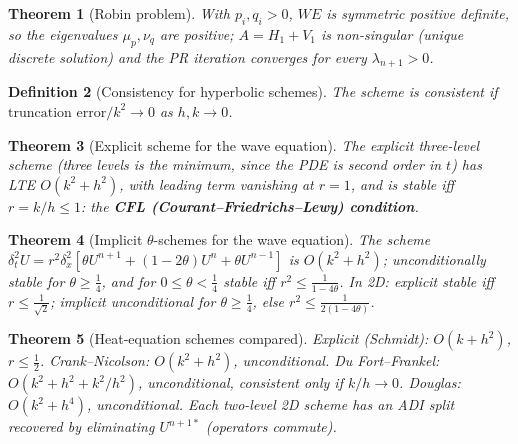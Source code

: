 \documentclass[10pt,a4paper]{article}
\theoremstyle{tight}
\newtheorem{theorem}{Theorem}[section]
\newtheorem{definition}[theorem]{Definition}
\begin{document}
\begin{theorem}[Robin problem]
With \(p_i,q_i>0\), \(WE\) is symmetric positive definite, so the eigenvalues \(\mu_p,\nu_q\) are
positive; \(A=H_1+V_1\) is non-singular (unique discrete solution) and the PR iteration converges for
every \(\lambda_{n+1}>0\).
\end{theorem}

\begin{definition}[Consistency for hyperbolic schemes]
The scheme is consistent if \(\text{truncation error}/k^2\to0\) as \(h,k\to0\).
\end{definition}

\begin{theorem}[Explicit scheme for the wave equation]
The explicit three-level scheme (three levels is the minimum, since the PDE is second order in \(t\))
has LTE \(O(k^2+h^2)\), with leading term vanishing at \(r=1\), and is stable iff \(r=k/h\le1\):
the \textbf{CFL (Courant--Friedrichs--Lewy) condition}.
\end{theorem}

\begin{theorem}[Implicit \(\theta\)-schemes for the wave equation]
The scheme \(\delta_t^2U=r^2\delta_x^2[\theta U^{n+1}+(1-2\theta)U^n+\theta U^{n-1}]\) is \(O(k^2+h^2)\);
unconditionally stable for \(\theta\ge\frac14\), and for \(0\le\theta<\frac14\) stable iff
\(r^2\le\frac1{1-4\theta}\). In 2D: explicit stable iff \(r\le\frac1{\sqrt2}\); implicit unconditional for
\(\theta\ge\frac14\), else \(r^2\le\frac1{2(1-4\theta)}\).
\end{theorem}

\begin{theorem}[Heat-equation schemes compared]
Explicit (Schmidt): \(O(k+h^2)\), \(r\le\frac12\). Crank--Nicolson: \(O(k^2+h^2)\), unconditional.
Du Fort--Frankel: \(O(k^2+h^2+k^2/h^2)\), unconditional, consistent only if \(k/h\to0\).
Douglas: \(O(k^2+h^4)\), unconditional. Each two-level 2D scheme has an ADI split recovered by
eliminating \(U^{n+1*}\) (operators commute).
\end{theorem}
\end{document}
